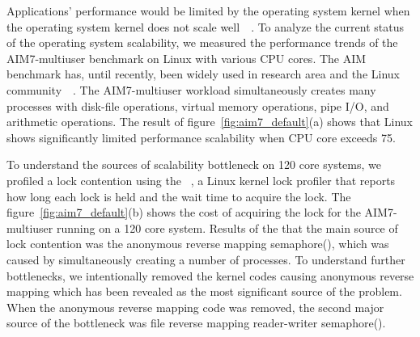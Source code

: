 Applications' performance would be limited by the operating system kernel when 
the operating system kernel does not scale well~\cite{Clements15SCR}~\cite{Boyd-WickizerCorey}.
To analyze the current status of the operating system scalability,
we measured the performance trends of the AIM7-multiuser benchmark on Linux
with various CPU cores.
The AIM benchmark has, until recently, been widely used in research area
and the Linux community~\cite{Bueso2015STP}~\cite{Bueso2014MCS}.
The AIM7-multiuser workload simultaneously creates many processes with
disk-file operations, virtual memory operations, pipe I/O, and arithmetic
operations.
The result of figure~\ref{fig:aim7_default}(a) shows that
Linux shows significantly limited performance scalability when CPU core 
exceeds 75.


To understand the sources of scalability bottleneck on 120 core systems, we profiled a 
lock contention using the ~\cite{LOCKSTAT}, a Linux kernel lock profiler that reports how
long each lock is held and the wait time to acquire the lock.
The figure~\ref{fig:aim7_default}(b) shows the cost of acquiring the lock for the AIM7-multiuser
running on a 120 core system.
Results of the  that the main source of lock contention was the 
anonymous reverse mapping semaphore(), 
which was caused by simultaneously creating a number of processes.
To understand further bottlenecks, we intentionally removed the kernel codes causing 
anonymous reverse mapping which has been revealed as the most significant source of the problem.
When the anonymous reverse mapping code was removed, 
the second major source of the bottleneck was file 
reverse mapping reader-writer semaphore().


